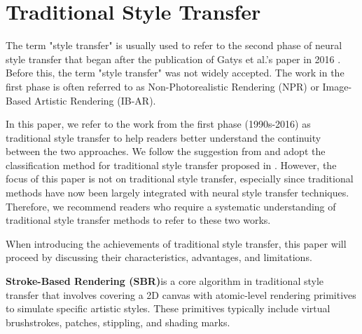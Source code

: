 \section{Traditional Style Transfer}

The term "style transfer" is usually used to refer to the second phase of neural style transfer that began after the publication of Gatys et al.'s paper in 2016 \citep{02gatys2016image}. Before this, the term "style transfer" was not widely accepted. The work in the first phase is often referred to as Non-Photorealistic Rendering (NPR) or Image-Based Artistic Rendering (IB-AR).

In this paper, we refer to the work from the first phase (1990s-2016) as traditional style transfer to help readers better understand the continuity between the two approaches. We follow the suggestion from \citep{01jing2019neural} and adopt the classification method for traditional style transfer proposed in \citep{21kyprianidis2012state}. However, the focus of this paper is not on traditional style transfer, especially since traditional methods have now been largely integrated with neural style transfer techniques. Therefore, we recommend readers who require a systematic understanding of traditional style transfer methods to refer to these two works\citep{01jing2019neural,21kyprianidis2012state}.

When introducing the achievements of traditional style transfer, this paper will proceed by discussing their characteristics, advantages, and limitations.

\textbf{Stroke-Based Rendering (SBR)}is a core algorithm in traditional style transfer that involves covering a 2D canvas with atomic-level rendering primitives to simulate specific artistic styles. These primitives typically include virtual brushstrokes, patches, stippling, and shading marks.

